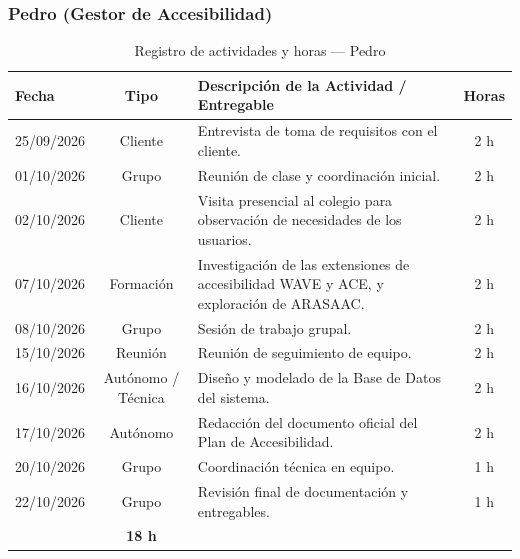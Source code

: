 \subsubsection{Pedro (Gestor de Accesibilidad)}
\begin{table}[H]
\centering
\small
{}
\begin{tabularx}{\textwidth}{l c X c}
\toprule
\rowcolor{verdeApagado}
\textbf{\color{textoOscuro}Fecha} & \textbf{\color{textoOscuro}Tipo} & \textbf{\color{textoOscuro}Descripción de la Actividad / Entregable} & \textbf{\color{textoOscuro}Horas} \\
\midrule
25/09/2026 & Cliente & Entrevista de toma de requisitos con el cliente. & 2 h \\
01/10/2026 & Grupo & Reunión de clase y coordinación inicial. & 2 h \\
02/10/2026 & Cliente & Visita presencial al colegio para observación de necesidades de los usuarios. & 2 h \\
07/10/2026 & Formación & Investigación de las extensiones de accesibilidad WAVE y ACE, y exploración de ARASAAC. & 2 h \\
08/10/2026 & Grupo & Sesión de trabajo grupal. & 2 h \\
15/10/2026 & Reunión & Reunión de seguimiento de equipo. & 2 h \\
16/10/2026 & Autónomo / Técnica & Diseño y modelado de la Base de Datos del sistema. & 2 h \\
17/10/2026 & Autónomo & Redacción del documento oficial del Plan de Accesibilidad. & 2 h \\
20/10/2026 & Grupo & Coordinación técnica en equipo. & 1 h \\
22/10/2026 & Grupo & Revisión final de documentación y entregables. & 1 h \\
\midrule
\rowcolor{azulclaro!60}
\multicolumn{3}{l}{\textbf{\color{textoOscuro}Total Horas Dedicadas — Pedro:}} & \textbf{\color{textoOscuro}18 h} \\
\bottomrule
\end{tabularx}
\caption{Registro de actividades y horas — Pedro}
\end{table}
